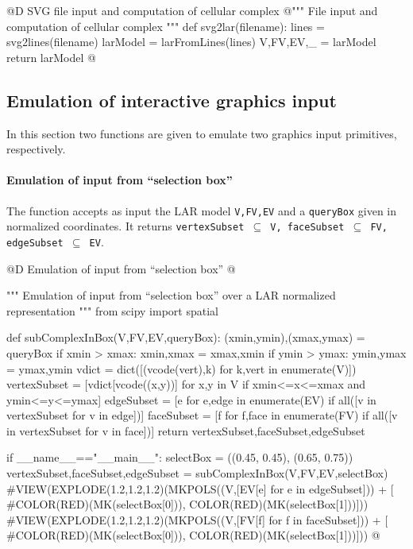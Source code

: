 \documentclass[11pt,oneside]{article}    %
\begin{document}
@D SVG file input and computation of cellular complex
@{""" File input and computation of cellular complex """
def svg2lar(filename):
    lines = svg2lines(filename)
    larModel = larFromLines(lines)
    V,FV,EV,_ = larModel
    return larModel
@}


\subsection{Emulation of interactive graphics input}

In this section two functions are given to emulate two graphics input primitives, respectively.

\paragraph{Emulation of input from ``selection box''}
The function accepts as input the LAR model \texttt{V,FV,EV} and a \texttt{queryBox} given in normalized coordinates. It returns \texttt{vertexSubset $\subseteq$ V, faceSubset $\subseteq$ FV, edgeSubset $\subseteq$ EV}.

@D Emulation of input from ``selection box''
@{""" Emulation of input from ``selection box'' over a LAR normalized representation """
from scipy import spatial

def subComplexInBox(V,FV,EV,queryBox):
    (xmin,ymin),(xmax,ymax) = queryBox
    if xmin > xmax: xmin,xmax = xmax,xmin
    if ymin > ymax: ymin,ymax = ymax,ymin
    vdict = dict([(vcode(vert),k) for k,vert in enumerate(V)])
    vertexSubset = [vdict[vcode((x,y))] for x,y in V if xmin<=x<=xmax and ymin<=y<=ymax]
    edgeSubset = [e for e,edge in enumerate(EV) if all([v in vertexSubset  for v in edge])]    
    faceSubset = [f for f,face in enumerate(FV) if all([v in vertexSubset  for v in face])]
    return vertexSubset,faceSubset,edgeSubset

if __name__=="__main__":
    selectBox = ((0.45, 0.45), (0.65, 0.75))
    vertexSubset,faceSubset,edgeSubset = subComplexInBox(V,FV,EV,selectBox)
    #VIEW(EXPLODE(1.2,1.2,1.2)(MKPOLS((V,[EV[e] for e in edgeSubset])) + [
        #COLOR(RED)(MK(selectBox[0])),  COLOR(RED)(MK(selectBox[1]))]))
    #VIEW(EXPLODE(1.2,1.2,1.2)(MKPOLS((V,[FV[f] for f in faceSubset])) + [
        #COLOR(RED)(MK(selectBox[0])),  COLOR(RED)(MK(selectBox[1]))]))
@}
\end{document}
